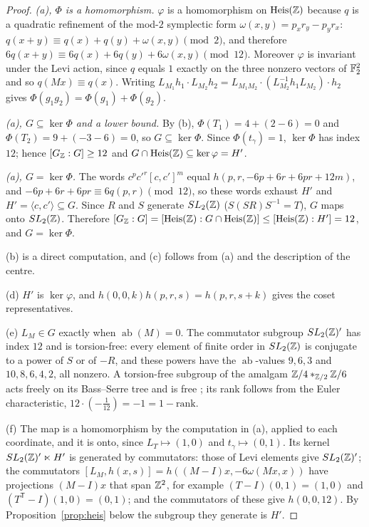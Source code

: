 \begin{proof}
\emph{(a), $\Phi$ is a homomorphism.} $\varphi$ is a homomorphism on $\mathrm{Heis}(\mathbb{Z})$ because $q$ is a quadratic refinement of the mod-$2$ symplectic form $\omega(x,y)=p_xr_y-p_yr_x$: $q(x+y)\equiv q(x)+q(y)+\omega(x,y)\pmod2$, and therefore $6q(x+y)\equiv6q(x)+6q(y)+6\omega(x,y)\pmod{12}$. Moreover $\varphi$ is invariant under the Levi action, since $q$ equals $1$ exactly on the three nonzero vectors of $\mathbb{F}_2^2$ and so $q(Mx)\equiv q(x)$. Writing $L_{M_1}h_1\cdot L_{M_2}h_2=L_{M_1M_2}\cdot(L_{M_2}^{-1}h_1L_{M_2})\cdot h_2$ gives $\Phi(g_1g_2)=\Phi(g_1)+\Phi(g_2)$.

\emph{(a), $G\subseteq\ker\Phi$ and a lower bound.} By (b), $\Phi(T_1)=4+(2-6)=0$ and $\Phi(T_2)=9+(-3-6)=0$, so $G\subseteq\ker\Phi$. Since $\Phi(t_\gamma)=1$, $\ker\Phi$ has index $12$; hence $[G_{\mathbb{Z}}:G]\ge12$ and $G\cap\mathrm{Heis}(\mathbb{Z})\subseteq\ker\varphi=H'$.

\emph{(a), $G=\ker\Phi$.} The words $c^pc'^r[c,c']^m$ equal $h(p,r,-6p+6r+6pr+12m)$, and $-6p+6r+6pr\equiv6q(p,r)\pmod{12}$, so these words exhaust $H'$ and $H'=\langle c,c'\rangle\subseteq G$. Since $R$ and $S$ generate $SL_2(\mathbb{Z})$ ($S(SR)S^{-1}=T$), $G$ maps onto $SL_2(\mathbb{Z})$. Therefore $[G_{\mathbb{Z}}:G]=[\mathrm{Heis}(\mathbb{Z}):G\cap\mathrm{Heis}(\mathbb{Z})]\le[\mathrm{Heis}(\mathbb{Z}):H']=12$, and $G=\ker\Phi$.

(b) is a direct computation, and (c) follows from (a) and the description of the centre.

(d) $H'$ is $\ker\varphi$, and $h(0,0,k)h(p,r,s)=h(p,r,s+k)$ gives the coset representatives.

(e) $L_M\in G$ exactly when $\operatorname{ab}(M)=0$. The commutator subgroup $SL_2(\mathbb{Z})'$ has index $12$ and is torsion-free: every element of finite order in $SL_2(\mathbb{Z})$ is conjugate to a power of $S$ or of $-R$, and these powers have the $\operatorname{ab}$-values $9,6,3$ and $10,8,6,4,2$, all nonzero. A torsion-free subgroup of the amalgam $\mathbb{Z}/4*_{\mathbb{Z}/2}\mathbb{Z}/6$ acts freely on its Bass--Serre tree and is free \cite[Ch.~I]{SerreTrees}; its rank follows from the Euler characteristic, $12\cdot(-\frac1{12})=-1=1-\mathrm{rank}$.

(f) The map is a homomorphism by the computation in (a), applied to each coordinate, and it is onto, since $L_T\mapsto(1,0)$ and $t_\gamma\mapsto(0,1)$. Its kernel $SL_2(\mathbb{Z})'\ltimes H'$ is generated by commutators: those of Levi elements give $SL_2(\mathbb{Z})'$; the commutators $[L_M,h(x,s)]=h((M-I)x,-6\omega(Mx,x))$ have projections $(M-I)x$ that span $\mathbb{Z}^2$, for example $(T-I)(0,1)=(1,0)$ and $(T^{\mathsf T}-I)(1,0)=(0,1)$; and the commutators of these give $h(0,0,12)$. By Proposition~\ref{prop:heis} below the subgroup they generate is $H'$.


\end{proof}
